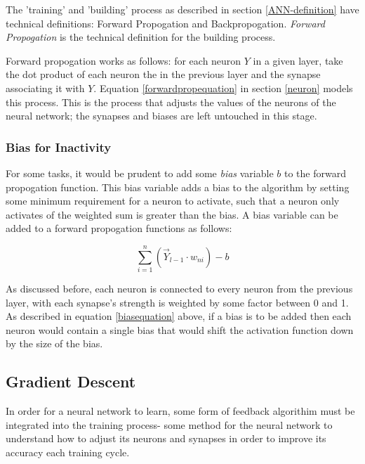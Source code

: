 \documentclass[12pt]{article}
\begin{document}
        The 'training' and 'building' process as described in section \ref{ANN-definition} have technical definitions: Forward Propogation and Backpropogation. \textit{Forward Propogation} is the technical definition for the building process. 

        Forward propogation works as follows: for each neuron \(Y\) in a given layer, take the dot product of each neuron the in the previous layer and the synapse associating it with \(Y\). Equation \ref{forwardpropequation} in section \ref{neuron} models this process. This is the process that adjusts the values of the neurons of the neural network; the synapses and biases are left untouched in this stage.

        \subsubsection{Bias for Inactivity}
            For some tasks, it would be prudent to add some \textit{bias} variable \(b\) to the forward propogation function. This bias variable adds a bias to the algorithm by setting some minimum requirement for a neuron to activate, such that a neuron only activates of the weighted sum is greater than the bias. A bias variable can be added to a forward propogation functions as follows: 
            
            \begin{equation} \label{biasequation}
                \sum_{i=1}^{n}(\vec Y_{l-1} \cdot  w_{ni}) -b
            \end{equation}

            As discussed before, each neuron is connected to every neuron from the previous layer, with each synapse's strength is weighted by some factor between 0 and 1. As described in equation \ref{biasequation} above, if a bias is to be added then each neuron would contain a single bias that would shift the activation function down by the size of the bias. 


    \subsection{Gradient Descent \label{gradient-descent}}
    
        In order for a neural network to learn, some form of feedback algorithim must be integrated into the training process- some method for the neural network to understand how to adjust its neurons and synapses in order to improve its accuracy each training cycle.
        
\end{document}
